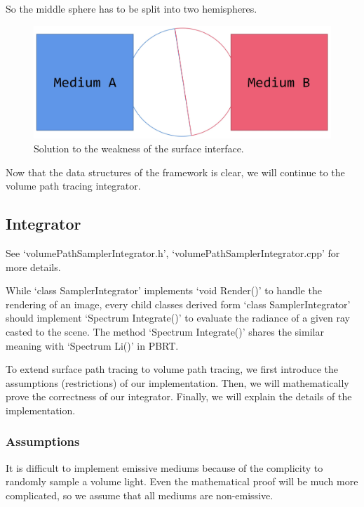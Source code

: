 \documentclass[acmtog]{acmart}
\begin{document}
    So the middle sphere has to be split into two hemispheres.
\begin{figure}[H]
    \includegraphics[scale=0.04]{pictures/surface weakness solution.png}
    \centering
    \caption{Solution to the weakness of the surface interface.}
\end{figure}
        Now that the data structures of the framework is clear, we will continue to the volume path tracing integrator.

\subsection{Integrator}
    See `volumePathSamplerIntegrator.h', `volumePathSamplerIntegrator.cpp' for more details.\par
        While `class SamplerIntegrator' implements `void Render()' to handle the rendering of an image, 
    every child classes derived form `class SamplerIntegrator' should implement `Spectrum Integrate()' to evaluate the radiance of a given ray casted to the scene.
    The method `Spectrum Integrate()' shares the similar meaning with `Spectrum Li()' in PBRT.\par
        To extend surface path tracing to volume path tracing, we first introduce the assumptions (restrictions) of our implementation.
    Then, we will mathematically prove the correctness of our integrator.
    Finally, we will explain the details of the implementation.
\subsubsection{Assumptions}
        It is difficult to implement emissive mediums because of the complicity to randomly sample a volume light.
    Even the mathematical proof will be much more complicated, 
    so we assume that all mediums are non-emissive.
\end{document}
